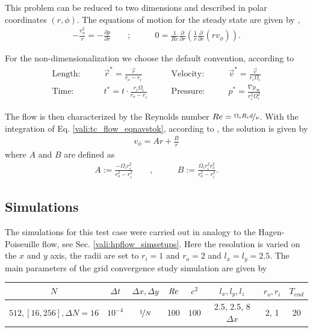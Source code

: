 This problem can be reduced to two dimensions and described in polar coordinates $(r, \phi)$. The equations of motion for the steady state are given by \citep{Kundu2012},
\begin{align}
    \label{vali:tc_flow_eqnavstok}
    -\frac{v^2_\phi}{r} = - \frac{\partial p}{\partial r} \qquad ;& \qquad 0 = \frac{1}{Re}\frac{\partial}{\partial r}\left(\frac{1}{r}\frac{\partial}{\partial r}(r v_\phi)\right).
\end{align}

\clearpage

For the non-dimensionalization we choose the default convention, according to  \citep{Chen2015}
\begin{align}
    \text{Length:}\qquad &  \vec{r}^* = \frac{\vec{r}}{r_o - r_i}  &
    \qquad \text{Velocity:}\qquad& \vec{v}^* =  \frac{\vec{v}}{r_i\Omega_i}\\
    \text{Time:}  \qquad & t^* = t \cdot \frac{r_i \Omega_i}{r_o - r_i}&
    \qquad  \text{Pressure:}\qquad & p^* = \frac{\nabla p_\infty}{r_i^2\Omega_i^2}
\end{align}


The flow is then characterized by the Reynolds number $Re = \nicefrac{\Omega_i R_i d}{\nu}$.
With the integration of Eq. \ref{vali:tc_flow_eqnavstok}, according to \citep{Kundu2012}, the solution is given by
\begin{align}
    v_\phi = Ar + \frac{B}{r}
\end{align}
where $A$ and $B$ are defined as
\begin{align}
    A := \frac{-\Omega_i r_i^2}{r^2_o - r^2_i} \qquad ,& \qquad B := \frac{\Omega_i r^2_i r^2_o}{r^2_o - r^2_i}.
\end{align}

\subsection{Simulations}


The simulations for this test case were carried out in analogy to the Hagen-Poiseuille flow, see Sec. \ref{vali:hpflow_simsetups}.
Here the resolution is varied on the $x$ and $y$ axis, the radii are set to $r_i=1$ and $r_o=2$ and $l_x=l_y=2.5$.
The main parameters of the grid convergence study simulation are  given by

\begin{center}
\vspace*{0.7ex}
\begin{tabular}{c|c|c|c|c|c|c|c }
 $ N  $                   & $\Delta t$ & $\Delta x, \Delta y$            & $\mbox{\textit{Re}}$  & $c^2$   & $l_x, l_y, l_z$ & $r_o, r_i$ & $T_{end}$\\
\hline
 $512, [16, 256], \Delta N = 16 $& $10^{-4}$ & $\nicefrac{1}{N}$ & 100     & $100$   & 2.5, 2.5, 8$\Delta x$ & 2, 1    & 20\\
\end{tabular}
\vspace*{0.7ex}
\end{center}

